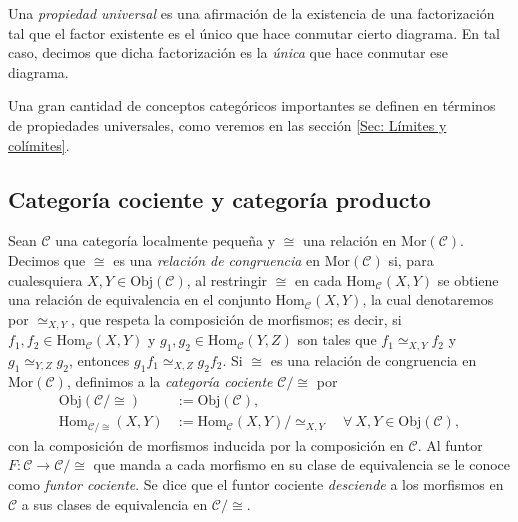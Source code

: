 \documentclass[tesis]{subfiles}
\begin{document}
\begin{Def}\label{Def: Propiedad universal}
    Una \emph{propiedad universal} es una afirmación de la existencia de una factorización tal que el factor existente es el único que hace conmutar cierto diagrama. En tal caso, decimos que dicha factorización es la \emph{única} que hace conmutar ese diagrama.
\end{Def}

Una gran cantidad de conceptos categóricos importantes se definen en términos de propiedades universales, como veremos en las sección \ref{Sec: Límites y colímites}. %

\subsection*{Categoría cociente y categoría producto} \label{Ssec: Categoría cociente y categoría producto}

\begin{Def}\label{Def: Relación de congruencia y categoría cociente}
    Sean $\mathscr{C}$ una categoría localmente pequeña y $\cong$ una relación en $\text{Mor}(\mathscr{C})$. Decimos que $\cong$ es una \emph{relación de congruencia} en $\text{Mor}(\mathscr{C})$ si, para cualesquiera $X,Y\in\text{Obj}(\mathscr{C})$, al restringir $\cong$ en cada $\text{Hom}_\mathscr{C}(X,Y)$ se obtiene una relación de equivalencia en el conjunto $\text{Hom}_\mathscr{C}(X,Y)$, la cual denotaremos por $\simeq_{X,Y}$, que respeta la composición de morfismos; es decir, si $f_1,f_2\in\text{Hom}_\mathscr{C}(X,Y)$ y $g_1,g_2\in\text{Hom}_\mathscr{C}(Y,Z)$ son tales que $f_1 \simeq_{X,Y} f_2$ y $g_1 \simeq_{Y,Z} g_2$, entonces $g_1f_1 \simeq_{X,Z} g_2f_2$. Si $\cong$ es una relación de congruencia en $\text{Mor}(\mathscr{C})$, definimos a la \emph{categoría cociente} $\mathscr{C}/\cong$ por
    \begin{align*}
        \text{Obj}(\mathscr{C}/\cong) &:= \text{Obj}(\mathscr{C}), \\
        \text{Hom}_{\mathscr{C}/\cong}(X,Y) &:= \text{Hom}_\mathscr{C}(X,Y)/\simeq_{X,Y} \quad \forall \ X,Y\in\text{Obj}(\mathscr{C}),
    \end{align*}
    con la composición de morfismos inducida por la composición en $\mathscr{C}$. Al funtor $F:\mathscr{C}\to \mathscr{C}/\cong$ que manda a cada morfismo en su clase de equivalencia se le conoce como \emph{funtor cociente}. Se dice que el funtor cociente \emph{desciende} a los morfismos en $\mathscr{C}$ a sus clases de equivalencia en $\mathscr{C}/\cong$.
\end{Def}
\end{document}
